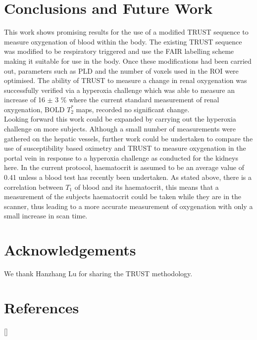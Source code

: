 \newpage
\section{Conclusions and Future Work}

This work shows promising results for the use of a modified \ac{TRUST} sequence to measure oxygenation of blood within the body. The existing \ac{TRUST} sequence was modified to be respiratory triggered and use the \ac{FAIR} labelling scheme making it suitable for use in the body. Once these modifications had been carried out, parameters such as \ac{PLD} and the number of voxels used in the \ac{ROI} were optimised. The ability of \ac{TRUST} to measure a change in renal oxygenation was successfully verified via a hyperoxia challenge which was able to measure an increase of 16 $\pm$ 3 \% where the current standard measurement of renal oxygenation, \ac{BOLD} $T_2^*$ maps, recorded no significant change.\\

Looking forward this work could be expanded by carrying out the hyperoxia challenge on more subjects. Although a small number of measurements were gathered on the hepatic vessels, further work could be undertaken to compare the use of susceptibility based oximetry and \ac{TRUST} to measure oxygenation in the portal vein in response to a hyperoxia challenge as conducted for the kidneys here. In the current protocol, haematocrit is assumed to be an average value of 0.41 unless a blood test has recently been undertaken. As stated above, there is a correlation between $T_1$ of blood and its haematocrit, this means that a measurement of the subjects haematocrit could be taken while they are in the scanner, thus leading to a more accurate measurement of oxygenation with only a small increase in scan time. 

\section{Acknowledgements}

We thank Hanzhang Lu for sharing the TRUST methodology.\\

\newpage
\section{References}
[\refname]{}
\printbibliography